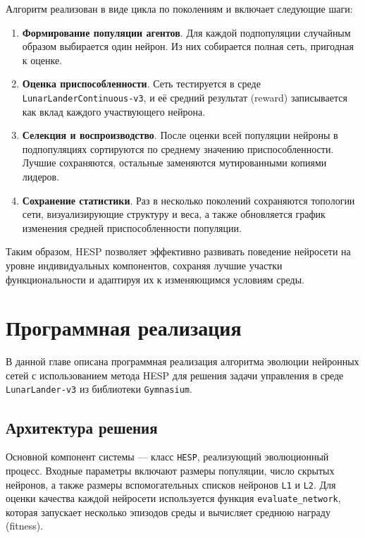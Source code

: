 \documentclass[a4paper,12pt]{article}
\begin{document}
Алгоритм реализован в виде цикла по поколениям и включает следующие шаги:

\begin{enumerate}
	\item \textbf{Формирование популяции агентов}. Для каждой подпопуляции случайным образом выбирается один нейрон. Из них собирается полная сеть, пригодная к оценке.
	
	\item \textbf{Оценка приспособленности}. Сеть тестируется в среде \texttt{LunarLanderContinuous-v3}, и её средний результат (reward) записывается как вклад каждого участвующего нейрона.

	\item \textbf{Селекция и воспроизводство}. После оценки всей популяции нейроны в подпопуляциях сортируются по среднему значению приспособленности. Лучшие сохраняются, остальные заменяются мутированными копиями лидеров.
	
	\item \textbf{Сохранение статистики}. Раз в несколько поколений сохраняются топологии сети, визуализирующие структуру и веса, а также обновляется график изменения средней приспособленности популяции.
\end{enumerate}

Таким образом, HESP позволяет эффективно развивать поведение нейросети на уровне индивидуальных компонентов, сохраняя лучшие участки функциональности и адаптируя их к изменяющимся условиям среды.




\newpage




\section{Программная реализация}

В данной главе описана программная реализация алгоритма эволюции нейронных сетей с использованием метода HESP для решения задачи управления в среде \texttt{LunarLander-v3} из библиотеки \texttt{Gymnasium}.

\subsection{Архитектура решения}

Основной компонент системы --- класс \texttt{HESP}, реализующий эволюционный процесс. Входные параметры включают размеры популяции, число скрытых нейронов, а также размеры вспомогательных списков нейронов \texttt{L1} и \texttt{L2}. Для оценки качества каждой нейросети используется функция \texttt{evaluate\_network}, которая запускает несколько эпизодов среды и вычисляет среднюю награду (fitness).
\end{document}
